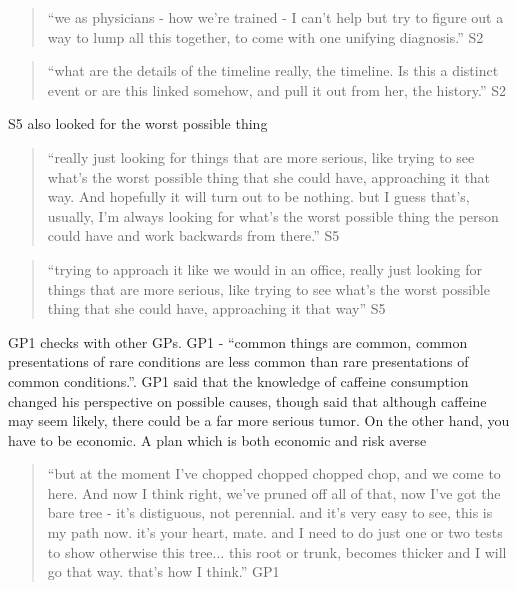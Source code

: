 \documentclass{sigchi}
\begin{document}
\begin{quote}
    ``we as physicians - how we're trained - I can't help but try to figure out a way to lump all this together, to come with one unifying diagnosis.'' S2
\end{quote}

\begin{quote}
    ``what are the details of the timeline really, the timeline. Is this a distinct event or are this linked somehow, and pull it out from her, the history.''  S2
\end{quote}

S5 also looked for the worst possible thing

\begin{quote}
    ``really just looking for things that are more serious, like trying to see what's the worst possible thing that she could have, approaching it that way. And hopefully it will turn out to be nothing. but I guess that’s, usually, I'm always looking for what's the worst possible thing the person could have and work backwards from there.'' S5
\end{quote}

\begin{quote}
    ``trying to approach it like we would in an office, really just looking for things that are more serious, like trying to see what's the worst possible thing that she could have, approaching it that way'' S5
\end{quote}

GP1 checks with other GPs. GP1 - ``common things are common, common presentations of rare conditions are less common than rare presentations of common conditions.''. GP1 said that the knowledge of caffeine consumption changed his perspective on possible causes, though said that although caffeine may seem likely, there could be a far more serious tumor. On the other hand, you have to be economic. A plan which is both economic and risk averse

\begin{quote}
    ``but at the moment I've chopped chopped chopped chop, and we come to here. And now I think right, we've pruned off all of that, now I've got the bare tree - it's distiguous, not perennial. and it's very easy to see, this is my path now. it's your heart, mate. and I need to do just one or two tests to show otherwise this tree... this root or trunk, becomes thicker and I will go that way. that's how I think.'' GP1
\end{quote}
\end{document}

